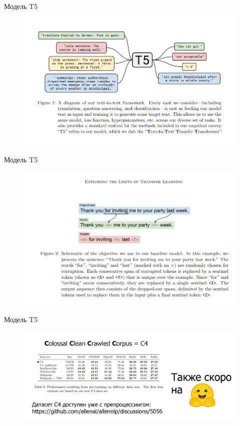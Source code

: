 \documentclass[aspectratio=169,xcolor=dvipsnames]{beamer}
\begin{document}
\begin{frame}{Модель T5}
\begin{figure}
\includegraphics[scale=0.5]{11.png}
\end{figure}
\end{frame}

\begin{frame}{Модель T5}
\begin{figure}
\includegraphics[scale=0.5]{12.png}
\end{figure}
\end{frame}

\begin{frame}{Модель T5}
\begin{figure}
\includegraphics[scale=0.4]{kek.jpg}
\end{figure}

\end{frame}
\end{document}
